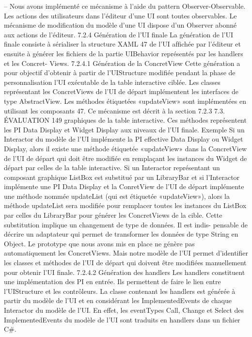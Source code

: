 \documentclass{article}
\begin{document}
– Nous avons implémenté ce mécanisme à l’aide du pattern Observer-Observable. Les actions
des utilisateurs dans l’éditeur d’une UI sont toutes observables. Le mécanisme de modiﬁcation
du modèle d’une UI dispose d’un Observer abonné aux actions de l’éditeur.
7.2.4
Génération de l’UI ﬁnale
La génération de l’UI ﬁnale consiste à sérialiser la structure XAML 47 de l’UI afﬁchée par l’éditeur
et ensuite à générer les ﬁchiers de la partie UIBehavior représentés par les handlers et les Concret-
Views.
7.2.4.1
Génération de la ConcretView
Cette génération a pour objectif d’obtenir à partir de l’UIStructure modiﬁée pendant la phase de
personnalisation l’UI exécutable de la table interactive ciblée.
Les classes représentant les ConcretViews de l’UI de départ implémentent les interfaces de type
AbstractView. Les méthodes étiquetées «updateView» sont implémentées en utilisant les composants
47. Ce mécanisme est décrit à la section 7.2.3
7.3. ÉVALUATION
149
graphiques de la table interactive. Ces méthodes représentent les PI Data Display et Widget Display
aux niveaux de l’UI ﬁnale.
Exemple
Si un Interactor du modèle de l’UI implémente la PI effective Data Display ou Widget
Display, alors il existe une méthode étiquetée «updateView» dans la ConcretView de l’UI de départ
qui doit être modiﬁée en remplaçant les instances du Widget de départ par celles de la table interactive.
Si un Interactor représentant un composant graphique ListBox est substitué par un LibraryBar
et si l’Interactor implémente une PI Data Display et la ConretView de l’UI de départ implémente
une méthode nommée updateList (qui est étiquetée «updateView»), alors la méthode updateList sera
modiﬁée pour remplacer toutes les instances du ListBox par celles du LibraryBar pour générer les
ConcretViews de la cible. Cette substitution implique un changement de type de données. Il est indis-
pensable de décrire un adaptateur qui permet de transformer les données de type String en Object.
Le prototype que nous avons mis en place ne génère pas automatiquement les ConcretViews. Mais
notre modèle de l’UI permet d’identiﬁer les classes et méthodes de l’UI de départ qui doivent être
modiﬁées manuellement pour obtenir l’UI ﬁnale.
7.2.4.2
Génération des handlers
Les handlers constituent une implémentation des PI en entrée. Ils permettent de faire le lien entre
l’UIStructure et les contrôleurs.
La classe contenant les handlers est générée à partir du modèle de l’UI et en considérant les
ImplementedEvents de chaque Interactor du modèle de l’UI. En effet, les eventTypes Call, Change et
Select des ImplementedEvents du modèle de l’UI sont traduits en handlers dans un ﬁchier C#.
\end{document}
